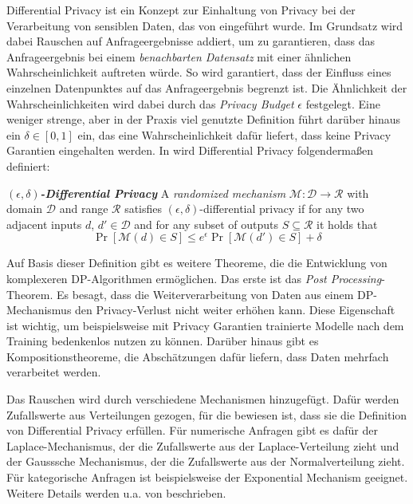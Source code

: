 Differential Privacy ist ein Konzept zur Einhaltung von Privacy bei der Verarbeitung von sensiblen Daten, das von \textcite{dwork:2006} eingeführt wurde. Im Grundsatz wird dabei Rauschen auf Anfrageergebnisse addiert, um zu garantieren, dass das Anfrageergebnis bei einem \textit{benachbarten Datensatz} mit einer ähnlichen Wahrscheinlichkeit auftreten würde. So wird garantiert, dass der Einfluss eines einzelnen Datenpunktes auf das Anfrageergebnis begrenzt ist. Die Ähnlichkeit der Wahrscheinlichkeiten wird dabei durch das \textit{Privacy Budget} $\epsilon$ festgelegt. Eine weniger strenge, aber in der Praxis viel genutzte Definition führt darüber hinaus ein $\delta \in [0,1]$ ein, das eine Wahrscheinlichkeit dafür liefert, dass keine Privacy Garantien eingehalten werden. In \textcite{abadi:2016} wird Differential Privacy folgendermaßen definiert:

\begin{definition}
  \emph{\textbf{$(\epsilon, \delta)$-Differential Privacy}} A \textit{randomized mechanism} $\mathcal{M}: \mathcal{D} \rightarrow \mathcal{R}$ with domain $\mathcal{D}$ and range $\mathcal{R}$ satisfies $(\epsilon, \delta)$-differential privacy if for any two adjacent inputs $d$, $d' \in \mathcal{D}$ and for any subset of outputs $S \subseteq \mathcal{R}$ it holds that $$\Pr[\mathcal{M}(d) \in S] \leq e^{\epsilon} \Pr[\mathcal{M}(d') \in S] + \delta$$
\end{definition}

Auf Basis dieser Definition gibt es weitere Theoreme, die die Entwicklung von komplexeren DP-Algorithmen ermöglichen. Das erste ist das \textit{Post Processing}-Theorem. Es besagt, dass die Weiterverarbeitung von Daten aus einem DP-Mechanismus den Privacy-Verlust nicht weiter erhöhen kann. Diese Eigenschaft ist wichtig, um beispielsweise mit Privacy Garantien trainierte Modelle nach dem Training bedenkenlos nutzen zu können. Darüber hinaus gibt es Kompositionstheoreme, die Abschätzungen dafür liefern, dass Daten mehrfach verarbeitet werden.

Das Rauschen wird durch verschiedene Mechanismen hinzugefügt. Dafür werden Zufallswerte aus Verteilungen gezogen, für die bewiesen ist, dass sie die Definition von Differential Privacy erfüllen. Für numerische Anfragen gibt es dafür der Laplace-Mechanismus, der die Zufallswerte aus der Laplace-Verteilung zieht und der Gausssche Mechanismus, der die Zufallswerte aus der Normalverteilung zieht. Für kategorische Anfragen ist beispielsweise der Exponential Mechanism geeignet. Weitere Details werden u.a. von \textcite{chang:2023} beschrieben.

